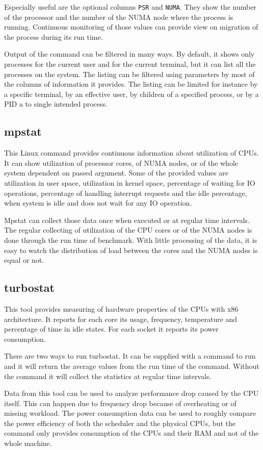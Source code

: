 Especially useful are the optional columns \texttt{PSR} and \texttt{NUMA}. They
show the number of the processor and the number of the NUMA node where the process is
running. Continuous monitoring of those values can provide view on migration of
the process during its run time. 

Output of the command can be filtered in many ways. By default, it shows only
processes for the current user and for the current terminal, but it can list all
the processes on the system. The listing can be filtered using parameters by
most of the columns of information it provides. The listing can be limited for
instance by a specific terminal, by an effective user, by children of a specified process,
or by a PID a to single intended process.

\subsection{mpstat}
This Linux command provides continuous information about utilization of CPUs. It
can show utilization of processor cores, of NUMA nodes, or of the whole system
dependent on passed argument. Some of the provided values are utilization in
user space, utilization in kernel space, percentage of waiting for IO
operations, percentage of handling interrupt requests and the idle percentage,
when system is idle and does not wait for any IO operation.

Mpstat can collect those data once when executed or at regular time intervals.
The regular collecting of utilization of the CPU cores or of the NUMA nodes is
done through the run time of benchmark. With little processing of the data, it
is easy to watch the distribution of load between the cores and the NUMA nodes
is equal or not.

\subsection{turbostat}
This tool provides measuring of hardware properties of the CPUs with x86
architecture. It reports for each core its usage, frequency, temperature and
percentage of time in idle states. For each socket it reports its power consumption.

There are two ways to run turbostat. It can be supplied with a command to run
and it will return the average values from the run time of the command. Without
the command it will collect the statistics at regular time intervals.

Data from this tool can be used to analyze performance drop caused by the CPU
itself. This can happen due to frequency drop because of overheating or of
missing workload. The power consumption data can be used to roughly compare the
power efficiency of both the scheduler and the physical CPUs, but the command
only provides consumption of the CPUs and their RAM and not of the whole
machine.

